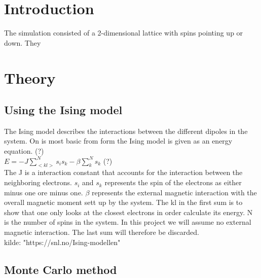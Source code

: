 \documentclass{article}
\begin{document}
\vspace{1cm}

\tableofcontents

\vspace{1cm}

\vspace{1cm}

\section{Introduction} \label{sec:Introduction}

The simulation consisted of a 2-dimensional lattice with spins pointing up or down. They

\vspace{1cm}

\section{Theory} \label{sec:Theory}

\subsection{Using the Ising model}

The Ising model describes the interactions between the different dipoles in the system. On is most basic from  form the Ising model is given as an energy equation. (?) \\

$E = -J \sum_{<kl>}^{N} s_i s_k - \beta \sum_{k}^{N}s_k$ (?) \\

The J is a interaction constant that accounts for the interaction between the neighboring electrons. $s_i$ and $s_k$ represents the spin of the electrons as either minus one ore minus one. $\beta$ represents the external magnetic interaction with the overall magnetic moment sett up by the system. The kl in the first sum is to show that one only looks at the closest electrons in order calculate its energy. N is the number of spins in the system. In this project we will assume no external magnetic interaction. The last sum will therefore be discarded. \\

kilde: "https://snl.no/Ising-modellen" \\

\subsection{Monte Carlo method}
\end{document}
